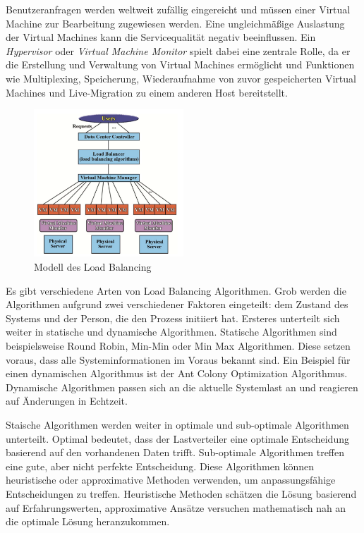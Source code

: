 \documentclass[a4paper,12pt]{article}
\begin{document}
Benutzeranfragen werden weltweit zufällig eingereicht und müssen einer Virtual Machine zur Bearbeitung zugewiesen werden. Eine ungleichmäßige Auslastung der Virtual Machines kann die Servicequalität negativ beeinflussen. Ein \textit{Hypervisor} oder \textit{Virtual Machine Monitor} spielt dabei eine zentrale Rolle, da er die Erstellung und Verwaltung von Virtual Machines ermöglicht und Funktionen wie Multiplexing, Speicherung, Wiederaufnahme von zuvor gespeicherten Virtual Machines und Live-Migration zu einem anderen Host bereitstellt. \cite[S. 2]{LoadBalancing}

\begin{figure}[h]
    \centering
    \includegraphics[width=0.5\textwidth]{images/Load_Balancing.png}
    \caption{Modell des Load Balancing \cite[S. 2]{LoadBalancing}}
    \label{fig:LoadBalancing}
\end{figure}

Es gibt verschiedene Arten von Load Balancing Algorithmen. Grob werden die Algorithmen aufgrund zwei verschiedener Faktoren eingeteilt: dem Zustand des Systems und der Person, die den Prozess initiiert hat. 
Ersteres unterteilt sich weiter in statische und dynamische Algorithmen. Statische Algorithmen sind beispielsweise Round Robin, Min-Min oder Min Max Algorithmen. Diese setzen voraus, dass alle Systeminformationen im Voraus bekannt sind. Ein Beispiel für einen dynamischen Algorithmus ist der Ant Colony Optimization Algorithmus. Dynamische Algorithmen passen sich an die aktuelle Systemlast an und reagieren auf Änderungen in Echtzeit. 

Staische Algorithmen werden weiter in optimale und sub-optimale Algorithmen unterteilt. Optimal bedeutet, dass der Lastverteiler eine optimale Entscheidung basierend auf den vorhandenen Daten trifft. Sub-optimale Algorithmen treffen eine gute, aber nicht perfekte Entscheidung. Diese Algorithmen können heuristische oder approximative Methoden verwenden, um anpassungsfähige Entscheidungen zu treffen. Heuristische Methoden schätzen die Lösung basierend auf Erfahrungswerten, approximative Ansätze versuchen mathematisch nah an die optimale Lösung heranzukommen. 
\end{document}
